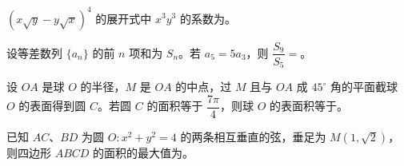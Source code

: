 \begin{question}
$(x\sqrt y-y\sqrt x)^4$ 的展开式中 $x^3y^3$ 的系数为\gkblank{}。

\end{question}
\begin{question}
设等差数列 $\{a_n\}$ 的前 $n$ 项和为 $S_n$。若 $a_5=5a_3$，则 $\dfrac{S_9}{S_5}=$\gkblank{}。

\end{question}
\begin{question}
设 $OA$ 是球 $O$ 的半径，$M$ 是 $OA$ 的中点，过 $M$ 且与 $OA$ 成 $45^\circ$ 角的平面截球 $O$ 的表面得到圆 $C$。若圆 $C$ 的面积等于 $\dfrac{7\pi}{4}$，则球 $O$ 的表面积等于\gkblank{}。

\end{question}
\begin{question}
已知 $AC\text{、}BD$ 为圆 $O:x^2+y^2=4$ 的两条相互垂直的弦，垂足为 $M(1,\sqrt2)$，则四边形 $ABCD$ 的面积的最大值为\gkblank{}。

\end{question}

